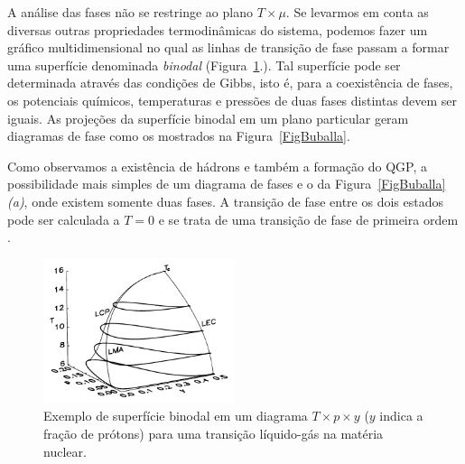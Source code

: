 A análise das fases não se restringe ao plano $T \times \mu$. Se levarmos em conta as diversas outras propriedades termodinâmicas do sistema, podemos fazer um gráfico multidimensional no qual as linhas de transição de fase passam a formar uma superfície denominada \emph{binodal} (Figura~\ref{Fig:binodal}\cite{MuellerSerot}.). Tal superfície pode ser determinada através das condições de Gibbs, isto é, para a coexistência de fases, os potenciais químicos, temperaturas e pressões de duas fases distintas devem ser iguais. As projeções da superfície binodal em um plano particular geram diagramas de fase como os mostrados na Figura~\ref{FigBuballa}\cite{Buballa}.

Como observamos a existência de hádrons e também a formação do QGP, a possibilidade mais simples de um diagrama de fases e o da Figura~\ref{FigBuballa} \emph{(a)}, onde existem somente duas fases. A transição de fase entre os dois estados pode ser calculada a $T = 0$ e se trata de uma transição de fase de primeira ordem \cite{Stephanov2004}. 

\begin{figure}
	\includegraphics[width=0.5\textwidth]{Figures/binodal_mueller_serot.png}
	\caption{Exemplo de superfície binodal em um diagrama $T \times p \times y$ ($y$ indica a fração de prótons) para uma transição líquido-gás na matéria nuclear.}
	\label{Fig:binodal}
\end{figure}

